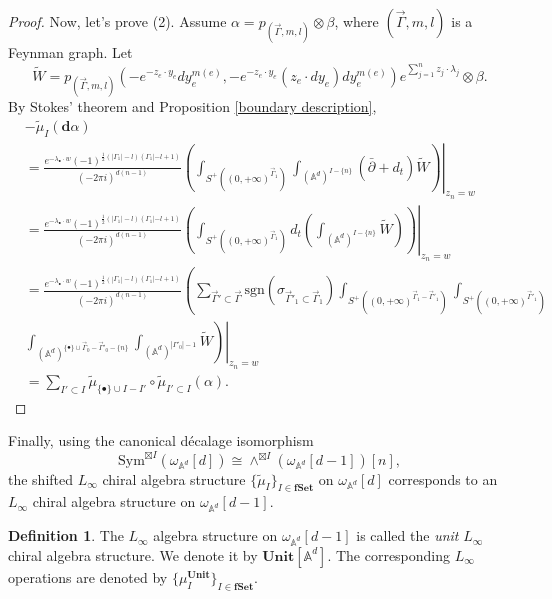 \documentclass[11pt]{amsart}
\theoremstyle{definition}
\newtheorem{defn}[thm]{Definition}
\theoremstyle{remark}
\numberwithin{equation}{section}
\begin{document}
\begin{proof}
    Now, let's prove (2). Assume $\alpha=p_{(\vec{\Gamma},m,l)}\otimes\beta$, where $(\vec{\Gamma},m,l)$ is a Feynman graph. Let
    $$
    \tilde{W}=p_{(\vec{\Gamma},m,l)}(-e^{-z_{e}\cdot y_{e}}dy_{e}^{m(e)},-e^{-z_{e}\cdot y_{e}}(z_{e}\cdot dy_{e})dy_{e}^{m(e)})e^{\sum_{j=1}^{n}z_{j}\cdot\lambda_{j}}\otimes\beta.
    $$
    By Stokes' theorem and Proposition \ref{boundary description},
    \begin{align*}
        &-\tilde{\mu}_{ I}(\mathbf{d}\alpha)\\
        &=\frac{e^{-\lambda_{\bullet}\cdot w}(-1)^{\frac{1}{2}(|\Gamma_{1}|-l)(\Gamma_{1}|-l+1)}}{(-2\pi i)^{d(n-1)}}\left.\left(\int_{S^{+}((0,+\infty)^{\vec{\Gamma}_{1}})}\int_{(\mathbb{A}^{d})^{ I-\{n\}}}(\bar{\partial}+d_t)\tilde{W}\right)\right|_{z_n=w}\\
        &=
        \frac{e^{-\lambda_{\bullet}\cdot w}(-1)^{\frac{1}{2}(|\Gamma_{1}|-l)(\Gamma_{1}|-l+1)}}{(-2\pi i)^{d(n-1)}}\left.\left(\int_{S^{+}((0,+\infty)^{\vec{\Gamma}_{1}})}d_{t}\left(\int_{(\mathbb{A}^{d})^{ I-\{n\}}}\tilde{W}\right)\right)\right|_{z_n=w}\\
        &=
        \frac{e^{-\lambda_{\bullet}\cdot w}(-1)^{\frac{1}{2}(|\Gamma_{1}|-l)(\Gamma_{1}|-l+1)}}{(-2\pi i)^{d(n-1)}}\left(\sum_{\vec{\Gamma}'\subset \vec{\Gamma}}\mathrm{sgn}(\sigma_{\vec{\Gamma}'_{1}\subset \vec{\Gamma}_{1}})\int_{S^{+}((0,+\infty)^{\vec{\Gamma}_{1}- \vec{\Gamma}'_{1}})}\int_{S^{+}((0,+\infty)^{\vec{\Gamma}'_{1}})}\right.\\
        &
        \left.\left.\int_{(\mathbb{A}^{d})^{\{\bullet\}\cup\vec{\Gamma}_{0}-\vec{\Gamma}'_{0}-\{n\}}}\int_{(\mathbb{A}^{d})^{|\Gamma'_{0}|-1}}\tilde{W}\right)\right|_{z_n=w}\\
        &=
        \sum_{ I'\subset I}\tilde{\mu}_{\{\bullet\}\cup I- I'}\circ \tilde{\mu}_{ I'\subset I}(\alpha).
    \end{align*}
\end{proof}

Finally, using the canonical d\'{e}calage isomorphism
$$
\mathrm{Sym}^{\boxtimes I}(\omega_{\mathbb{A}^{d}}[d])\cong \wedge^{\boxtimes I}(\omega_{\mathbb{A}^{d}}[d-1])[n],
$$
the shifted $L_{\infty}$ chiral algebra structure $\{\tilde{\mu}_{ I}\}_{ I\in \mathbf{fSet}}$ on $\omega_{\mathbb{A}^{d}}[d]$ corresponds to an $L_{\infty}$ chiral algebra structure on $\omega_{\mathbb{A}^{d}}[d-1]$.
\begin{defn}
  The $L_{\infty}$ algebra structure on $\omega_{\mathbb{A}^{d}}[d-1]$ is called the \textit{unit} $L_{\infty}$ chiral algebra structure. We denote it by $\mathbf{Unit}[\mathbb{A}^d]$. The corresponding $L_{\infty}$ operations are denoted by $\{\mu^{\mathbf{Unit}}_{ I}\}_{ I\in \mathbf{fSet}}$.
\end{defn}
\end{document}
